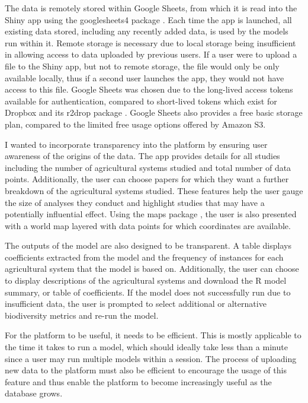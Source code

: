 \documentclass[11pt]{article}
\begin{document}
			\noindent The data is remotely stored within Google Sheets, from which it is read into the Shiny app using the googlesheets4 package \parencite{bryan2020googlesheets4}. Each time the app is launched, all existing data stored, including any recently added data, is used by the models run within it. Remote storage is necessary due to local storage being insufficient in allowing access to data uploaded by previous users. If a user were to upload a file to the Shiny app, but not to remote storage, the file would only be only available locally, thus if a second user launches the app, they would not have access to this file. Google Sheets was chosen due to the long-lived access tokens available for authentication, compared to short-lived tokens which exist for Dropbox and its r2drop package \parencite{ram2020rdrop2}. Google Sheets also provides a free basic storage plan, compared to the limited free usage options offered by Amazon S3. 
			
			\noindent I wanted to incorporate transparency into the platform by ensuring user awareness of the  origins of the data. The app provides details for all studies including the number of agricultural systems studied and total number of data points. Additionally, the user can choose papers for which they want a further breakdown of the agricultural systems studied. These features help the user gauge the size of analyses they conduct and highlight studies that may have a potentially influential effect. Using the maps package \parencite{becker2021maps}, the user is also presented with a world map layered with data points for which coordinates are available.
			
			\noindent The outputs of the model are also designed to be transparent. A table displays coefficients extracted from the model and the frequency of instances for each agricultural system that the model is based on. Additionally, the user can choose to display descriptions of the agricultural systems and download the R model summary, or table of coefficients. If the model does not successfully run due to insufficient data, the user is prompted to select additional or alternative biodiversity metrics and re-run the model.
			
			\noindent For the platform to be useful, it needs to be efficient. This is mostly applicable to the time it takes to run a model, which should ideally take less than a minute since a user may run multiple models within a session. The process of uploading new data to the platform must also be efficient to encourage the usage of this feature and thus enable the platform to become increasingly useful as the database grows.
			
\end{document}

